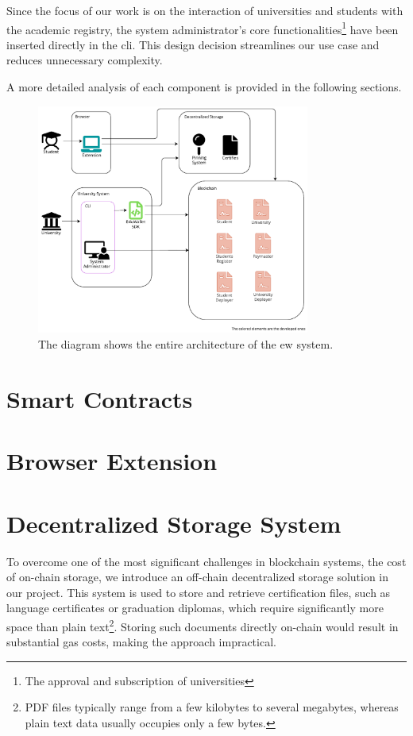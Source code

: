 Since the focus of our work is on the interaction of universities and students with the academic registry, the system administrator's core functionalities\footnote{The approval and subscription of universities} have been inserted directly in the \acrshort{cli}. This design decision streamlines our use case and reduces unnecessary complexity.

A more detailed analysis of each component is provided in the following sections.

\begin{figure}
  \centering
  \includegraphics[width=0.8\textwidth]{figures/Architecture diagram complete.pdf}
  \caption[System architecture diagram]{The diagram shows the entire architecture of the \acrlong{ew} system.}
  \label{fig:fullArchDiag}
\end{figure}

\section{Smart Contracts}
\label{sec:smartContractsDesign}

\section{Browser Extension}
\label{sec:browserExtensionDesign}

\section{Decentralized Storage System}
\label{sec:decStorageDesgn}
To overcome one of the most significant challenges in blockchain systems, the cost of on-chain storage, we introduce an off-chain decentralized storage solution in our project. This system is used to store and retrieve certification files, such as language certificates or graduation diplomas, which require significantly more space than plain text\footnote{PDF files typically range from a few kilobytes to several megabytes, whereas plain text data usually occupies only a few bytes.}. Storing such documents directly on-chain would result in substantial gas costs, making the approach impractical. 

